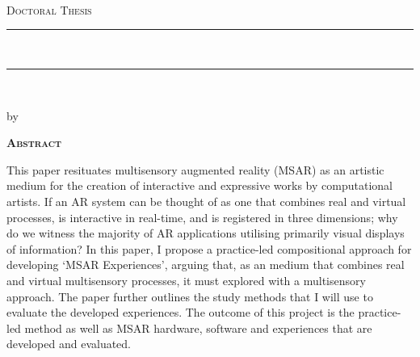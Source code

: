 
\thispagestyle{empty}

\begin{center}

    {\normalsize \href{http://www.sussex.ac.uk/}{\myUni} \\} %
    {\normalsize \myFaculty \\} %
    {\normalsize \myDepartment \\} %
    \bigskip\vspace*{.02\textheight}
    {\Large \textsc{Doctoral Thesis}}\par
    \bigskip
    
    {\rule{\linewidth}{1pt}\\%
    \Large \myTitle \par} %
    \rule{\linewidth}{1pt}\\[0.4cm]
    
    \bigskip
	{\normalsize by \myName \par} %
    \bigskip\vspace*{.06\textheight}
\end{center}

    {\centering\Huge\textsc{\textbf{Abstract}} \par}
    \bigskip



    \noindent This paper resituates multisensory augmented reality (MSAR) as an artistic medium for the creation of interactive and expressive works by computational artists. If an AR system can be thought of as one that combines real and virtual processes, is interactive in real-time, and is registered in three dimensions; why do we witness the majority of AR applications utilising primarily visual displays of information? In this paper, I propose a practice-led compositional approach for developing `MSAR Experiences', arguing that, as an medium that combines real and virtual multisensory processes, it must explored with a multisensory approach. The paper further outlines the study methods that I will use to evaluate the developed experiences. The outcome of this project is the practice-led method as well as MSAR hardware, software and experiences that are developed and evaluated.
 
